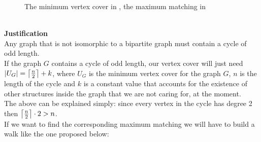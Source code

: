 \begin{enumerate}[a)]
\begin{figure}[h]
        \caption{The minimum vertex cover in , the maximum matching in }
    \end{figure}
    \\
    \linebreak
    \textbf{Justification}\\
    Any graph that is not isomorphic to a bipartite graph must contain a cycle of odd length. \\
    \linebreak
    If the graph $G$ contains a cycle of odd length, our vertex cover will just need $|U_G| = \left\lceil\frac{n}{2}\right\rceil + k$, where $U_G$ is the minimum vertex cover for the graph $G$, $n$ is the length of the cycle and $k$ is a constant value that accounts for the existence of other structures inside the graph that we are not caring for, at the moment.\\
    The above can be explained simply: since every vertex in the cycle has degree 2 then $\left\lceil\frac{n}{2}\right\rceil \cdot 2 > n$.\\
    \linebreak
    If we want to find the corresponding maximum matching we will have to build a walk like the one proposed below:
    \begin{center}
\end{center}
\end{enumerate}
